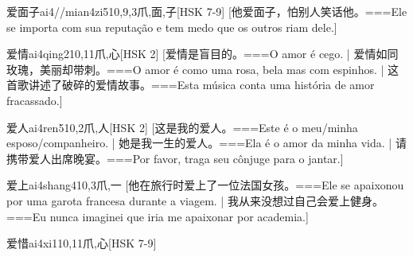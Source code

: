 \begin{EntryWithPhonetic}{爱面子}{ai4//mian4zi5}{10,9,3}{⽖,⾯,⼦}[HSK 7-9]
  [他爱面子，怕别人笑话他。===Ele se importa com sua reputação e tem medo que os outros riam dele.]
\end{EntryWithPhonetic}

\begin{EntryWithPhonetic}{爱情}{ai4qing2}{10,11}{⽖,⼼}[HSK 2]
  [爱情是盲目的。===O amor é cego. | 爱情如同玫瑰，美丽却带刺。===O amor é como uma rosa, bela mas com espinhos.  | 这首歌讲述了破碎的爱情故事。===Esta música conta uma história de amor fracassado.]
\end{EntryWithPhonetic}

\begin{EntryWithPhonetic}{爱人}{ai4ren5}{10,2}{⽖,⼈}[HSK 2]
  [这是我的爱人。===Este é o meu/minha esposo/companheiro. | 她是我一生的爱人。===Ela é o amor da minha vida. | 请携带爱人出席晚宴。===Por favor, traga seu cônjuge para o jantar.]
\end{EntryWithPhonetic}

\begin{EntryWithPhonetic}{爱上}{ai4shang4}{10,3}{⽖,⼀}
  [他在旅行时爱上了一位法国女孩。===Ele se apaixonou por uma garota francesa durante a viagem.  | 我从来没想过自己会爱上健身。===Eu nunca imaginei que iria me apaixonar por academia.]
\end{EntryWithPhonetic}

\begin{EntryWithPhonetic}{爱惜}{ai4xi1}{10,11}{⽖,⼼}[HSK 7-9]
\end{EntryWithPhonetic}

